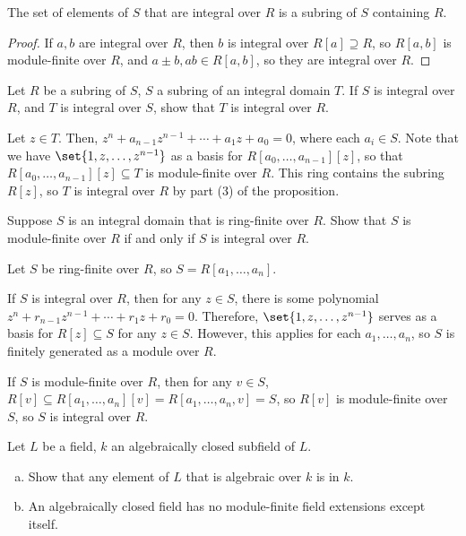 \documentclass[10pt]{mypackage}
\begin{document}
\begin{corollary}
  The set of elements of $S$ that are integral over $R$ is a subring of $S$ containing $R$.
\end{corollary}
\begin{proof}
  If $a,b$ are integral over $R$, then $b$ is integral over $R\left[ a \right]\supseteq R$, so $R\left[ a,b \right]$ is module-finite over $R$, and $a\pm b,ab\in R\left[ a,b \right]$, so they are integral over $R$.
\end{proof}
\begin{exercise}[Exercise 1.46]
  Let $R$ be a subring of $S$, $S$ a subring of an integral domain $T$. If $S$ is integral over $R$, and $T$ is integral over $S$, show that $T$ is integral over $R$.
\end{exercise}
\begin{solution}
  Let $z\in T$. Then, $z^n + a_{n-1}z^{n-1} + \cdots + a_1 z + a_0 = 0$, where each $a_i\in S$. Note that we have $\set{1,z,\dots,z^{n-1}}$ as a basis for $R\left[ a_0,\dots,a_{n-1} \right]\left[ z \right]$, so that $R\left[ a_0,\dots,a_{n-1} \right]\left[ z \right]\subseteq T$ is module-finite over $R$. This ring contains the subring $R\left[ z \right]$, so $T$ is integral over $R$ by part (3) of the proposition.
\end{solution}
\begin{exercise}[Exercise 1.47]
  Suppose $S$ is an integral domain that is ring-finite over $R$. Show that $S$ is module-finite over $R$ if and only if $S$ is integral over $R$.
\end{exercise}
\begin{solution}
  Let $S$ be ring-finite over $R$, so $S = R\left[ a_1,\dots,a_n \right]$.\newline

  If $S$ is integral over $R$, then for any $z\in S$, there is some polynomial $z^n + r_{n-1}z^{n-1} + \cdots + r_1 z + r_0 = 0$. Therefore, $\set{1,z,\dots,z^{n-1}}$ serves as a basis for $R\left[ z \right]\subseteq S$ for any $z\in S$. However, this applies for each $a_1,\dots,a_n$, so $S$ is finitely generated as a module over $R$.\newline

  If $S$ is module-finite over $R$, then for any $v\in S$, $R\left[ v \right]\subseteq R\left[ a_1,\dots,a_n \right]\left[ v \right] = R\left[ a_1,\dots,a_n,v \right] = S$, so $R\left[ v \right]$ is module-finite over $S$, so $S$ is integral over $R$.
\end{solution}
\begin{exercise}[Exercise 1.48]
  Let $L$ be a field, $k$ an algebraically closed subfield of $L$.
  \begin{enumerate}[(a)]
    \item Show that any element of $L$ that is algebraic over $k$ is in $k$.
    \item An algebraically closed field has no module-finite field extensions except itself.
  \end{enumerate}
\end{exercise}
\end{document}
